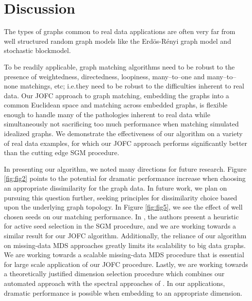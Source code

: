 \documentclass[12pt]{article}
\numberwithin{equation}{section}
\theoremstyle{definition}
\begin{document}
\section{Discussion}
The types of graphs common to real data applications are often very far
from well structured random graph models like the Erd\"os-R\'enyi graph
model and stochastic blockmodel.
 
To be readily applicable, graph matching
algorithms need to be robust to the presence of weightedness,
directedness, loopiness, many--to--one and many--to--none matchings,
etc; i.e.\@ they need to be robust to the difficulties inherent to real
data.  Our JOFC approach to graph matching, embedding the graphs into a
common Euclidean space and matching across embedded graphs, is flexible
enough to handle many of the pathologies inherent to real data while
simultaneously not sacrificing too much performance when matching
simulated idealized graphs.  We demonstrate the effectiveness of our
algorithm on a variety of real data examples, for which our JOFC
approach performs significantly better than the cutting edge SGM
procedure.

In presenting our algorithm, we noted many directions for future
research.  Figure \ref{fig:fig2} points to the potential for dramatic
performance increase when choosing an appropriate dissimilarity
for the graph data.  In future work, we plan on pursuing this question
further, seeking principles for dissimilarity choice based upon the
underlying graph topology.   In Figure \ref{fig:fig5}, we see the effect
of well chosen seeds on our matching performance.  In \cite{lsgm}, the
authors present a heuristic for active seed selection in the SGM
procedure, and we are working towards a similar result for our JOFC
algorithm.  Additionally, the reliance of our algorithm on
missing-data MDS approaches greatly limits its scalability to big data
graphs.  We are working towards a scalable missing-data MDS procedure
that is essential for large scale application of our JOFC procedure.
Lastly, we are working towards a theoretically justified dimension
selection procedure which combines our automated approach with the
spectral approaches of \cite{scree}.  In our applications, dramatic
performance is possible when embedding to an appropriate dimension.
\end{document}
